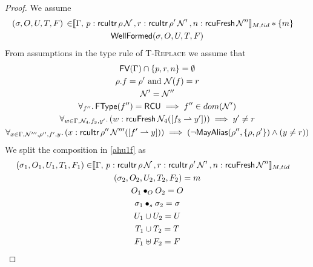  \begin{proof}
 We assume
\begin{gather}\label{ahu1f}
  \begin{aligned}
    (\sigma, O, U, T,F) \, \in &  \llbracket \Gamma,\,
 p:\textsf{rcuItr}\, \rho \, \mathcal{N} \, ,
  r:\textsf{rcuItr}\, \rho' \, \mathcal{N}' \, , n:\textsf{rcuFresh} \, \mathcal{N}'' \rrbracket_{M,tid} * \{m\}
    \end{aligned} \\
\textsf{WellFormed}(\sigma,O,U,T,F)
\label{ahu2f}
\end{gather}
From assumptions in the type rule of \textsc{T-Replace} we assume that
\begin{gather}
\textsf{FV}(\Gamma) \cap \{p,r,n\}  =\emptyset 
  \label{ahu3f} \\
\rho.f  = \rho' \text{ and } \mathcal{N}(f) = r
    \label{ahu4f} \\
\mathcal{N}' = \mathcal{N}''
\label{ahu5f} \\
\forall_{f''} \ldotp \textsf{FType}(f'')=\textsf{RCU} \implies f'' \in dom(\mathcal{N}')
\label{ahu5bf} \\
\forall_{w \in \Gamma, \mathcal{N}_4, f_3, y'} \ldotp (w:\textsf{rcuFresh}\,\mathcal{N}_4([f_3\rightharpoonup y'])) \implies y' \neq r
\label{ahu5cf} \\
\begin{aligned}
\forall_{x \in \Gamma, \mathcal{N}''', \rho'',f',y} \ldotp (x:\textsf{rcuItr}\,\rho''\,\mathcal{N}'''([f'\rightharpoonup y])) \implies (\neg\mathsf{MayAlias}(\rho'',\{\rho,\rho'\}) \land (y\neq r  ))
\label{ahu6f}
  \end{aligned}
\end{gather}
We split the composition in  \ref{ahu1f} as 
\begin{gather} \label{ahu11f}
  \begin{aligned}
    (\sigma_1, O_{1}, U_{1}, T_{1} ,F_1) \in & \llbracket \Gamma,\,
 p:\textsf{rcuItr}\, \rho \, \N \, ,
  r:\textsf{rcuItr}\, \rho' \, \N' \, , n:\textsf{rcuFresh} \, \N'' \rrbracket_{M,tid} \end{aligned}\\
\label{ahu12f}
(\sigma_2, O_{2}, U_{2}, T_{2},F_2) = m
\\
\label{ahu13f}
O_{1} \bullet_{O} O_{2} = O
\\
\label{ahusigf}
\sigma_1 \bullet_s \sigma_2 = \sigma \\
\label{ahu14f}
U_{1} \cup U_{2} = U
\\
\label{ahu15f}
T_{1} \cup T_{2} = T
\\
\label{ahufff}
F_1 \uplus F_2 = F
\\

\end{gather}
\end{proof}
